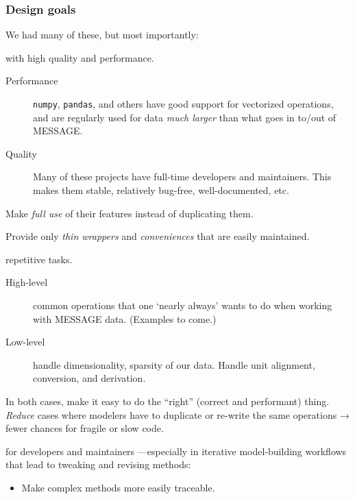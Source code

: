 \documentclass[12pt,aspectratio=169]{beamer}
\renewcommand{\mod}[1]{\texttt{#1}}
\begin{document}
\begin{frame}[allowframebreaks]
\frametitle{Design goals}
We had many of these, but most importantly:

\bigskip
{} with high quality and performance.

\begin{description}
  \item [Performance] \mod{numpy}, \mod{pandas}, and others have good support for vectorized operations,
    and are regularly used for data \emph{much larger} than what goes in to/out of MESSAGE.
  \item [Quality] Many of these projects have full-time developers and maintainers.
    This makes them stable, relatively bug-free, well-documented, etc.
\end{description}

Make \emph{full use} of their features instead of duplicating them.

Provide only \emph{thin wrappers} and \emph{conveniences} that are easily maintained.

\framebreak
{} repetitive tasks.

\begin{description}
  \item [High-level] common operations that one ‘nearly always' wants to do
    when working with MESSAGE data. (Examples to come.)
  \item [Low-level] handle dimensionality, sparsity of our data.
    Handle unit alignment, conversion, and derivation.
\end{description}

In both cases, make it easy to do the “right” (correct and performant) thing.
\emph{Reduce} cases where modelers have to duplicate or re-write the same operations →
fewer chances for fragile or slow code.

\medskip

 for developers and maintainers%
—especially in iterative model-building workflows that lead to tweaking and revising methods:
\begin{itemize}
  \item Make complex methods more easily traceable.
\end{itemize}
\end{frame}
\end{document}

